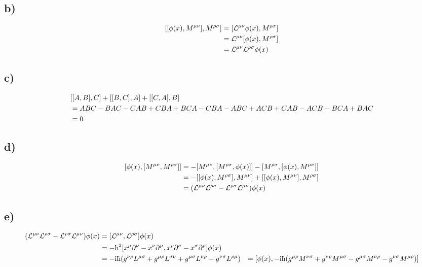 \documentclass[twoside]{amsart}
\numberwithin{equation}{section}
\begin{document}
\subsection*{\textbf{b)}}

\begin{align*}
    \comm{\comm{\phi\qty(x)}{M^{\mu\nu}}}{M^{\rho\sigma}}&=\comm{{\mathcal L}^{\mu\nu}\phi\qty(x)}{M^{\rho\sigma}}\\
    &={\mathcal L}^{\mu\nu}\comm{\phi\qty(x)}{M^{\rho\sigma}}\\
    &={\mathcal L}^{\mu\nu}{\mathcal L}^{\rho\sigma}\phi\qty(x)
\end{align*}

\subsection*{\textbf{c)}}

\begin{align*}
    &\comm{\comm{A}{B}}{C}+\comm{\comm{B}{C}}{A}+\comm{\comm{C}{A}}{B}\\
    &=ABC-BAC-CAB+CBA+BCA-CBA-ABC+ACB+CAB-ACB-BCA+BAC\\
    &=0
\end{align*}

\subsection*{\textbf{d)}}

\begin{align*}
    \comm{\phi\qty(x)}{\comm{M^{\mu\nu}}{M^{\rho\sigma}}}&=-\comm{M^{\mu\nu}}{\comm{M^{\rho\sigma}}{\phi\qty(x)}}-\comm{M^{\rho\sigma}}{\comm{\phi\qty(x)}{M^{\mu\nu}}}\\
    &=-\comm{\comm{\phi\qty(x)}{M^{\rho\sigma}}}{M^{\mu\nu}}+\comm{\comm{\phi\qty(x)}{M^{\mu\nu}}}{M^{\rho\sigma}}\\
    &=\qty({\mathcal L}^{\mu\nu}{\mathcal L}^{\rho\sigma}-{\mathcal L}^{\rho\sigma}{\mathcal L}^{\mu\nu})\phi\qty(x)
\end{align*}

\subsection*{\textbf{e)}}

\begin{align*}
    \qty({\mathcal L}^{\mu\nu}{\mathcal L}^{\rho\sigma}-{\mathcal L}^{\rho\sigma}{\mathcal L}^{\mu\nu})\phi\qty(x)&=\comm{{\mathcal L}^{\mu\nu}}{{\mathcal L}^{\rho\sigma}}\phi\qty(x)\\
    &=-\hbar^2\comm{x^\mu\partial^\nu-x^\nu\partial^\mu}{x^\rho\partial^\sigma-x^\sigma\partial^\rho}\phi\qty(x)\\
    &=-\im\hbar\qty(\tensor{g}{^\nu^\rho}\tensor{L}{^\mu^\sigma}+\tensor{g}{^\mu^\rho}\tensor{L}{^\sigma^\nu}+\tensor{g}{^\mu^\sigma}\tensor{L}{^\nu^\rho}-\tensor{g}{^\nu^\sigma}\tensor{L}{^\rho^\mu})
    &=\comm{\phi\qty(x)}{-\im\hbar\qty(g^{\mu\rho}M^{\nu\sigma}+g^{\nu\rho}M^{\mu\sigma}-g^{\mu\sigma}M^{\nu\rho}-g^{\nu\sigma}M^{\mu\rho})}
\end{align*}
\end{document}
